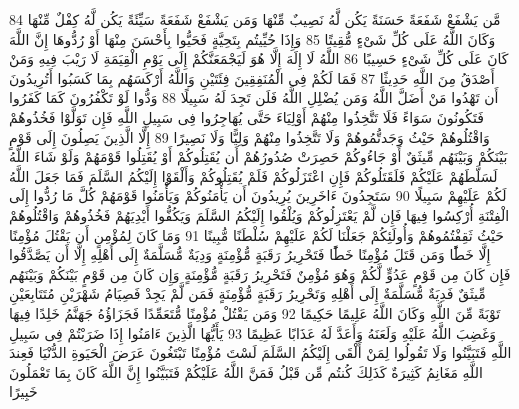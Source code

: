 {\tiny\colorbox{cl_aya}{84}} مَّن يَشْفَعْ شَفَعَةً حَسَنَةً يَكُن لَّهُ نَصِيبٌ مِّنْهَا وَمَن يَشْفَعْ شَفَعَةً سَيِّئَةً يَكُن لَّهُ كِفْلٌ مِّنْهَا وَكَانَ اللَّهُ عَلَى كُلِّ شَىْءٍ مُّقِيتًا
{\tiny\colorbox{cl_aya}{85}} وَإِذَا حُيِّيتُم بِتَحِيَّةٍ فَحَيُّوا بِأَحْسَنَ مِنْهَا أَوْ رُدُّوهَا إِنَّ اللَّهَ كَانَ عَلَى كُلِّ شَىْءٍ حَسِيبًا
{\tiny\colorbox{cl_aya}{86}} اللَّهُ لَا إِلَهَ إِلَّا هُوَ لَيَجْمَعَنَّكُمْ إِلَى يَوْمِ الْقِيَمَةِ لَا رَيْبَ فِيهِ وَمَنْ أَصْدَقُ مِنَ اللَّهِ حَدِيثًا
{\tiny\colorbox{cl_aya}{87}} فَمَا لَكُمْ فِى الْمُنَفِقِينَ فِئَتَيْنِ وَاللَّهُ أَرْكَسَهُم بِمَا كَسَبُوا أَتُرِيدُونَ أَن تَهْدُوا مَنْ أَضَلَّ اللَّهُ وَمَن يُضْلِلِ اللَّهُ فَلَن تَجِدَ لَهُ سَبِيلًا
{\tiny\colorbox{cl_aya}{88}} وَدُّوا لَوْ تَكْفُرُونَ كَمَا كَفَرُوا فَتَكُونُونَ سَوَاءً فَلَا تَتَّخِذُوا مِنْهُمْ أَوْلِيَاءَ حَتَّى يُهَاجِرُوا فِى سَبِيلِ اللَّهِ فَإِن تَوَلَّوْا فَخُذُوهُمْ وَاقْتُلُوهُمْ حَيْثُ وَجَدتُّمُوهُمْ وَلَا تَتَّخِذُوا مِنْهُمْ وَلِيًّا وَلَا نَصِيرًا
{\tiny\colorbox{cl_aya}{89}} إِلَّا الَّذِينَ يَصِلُونَ إِلَى قَوْمٍ بَيْنَكُمْ وَبَيْنَهُم مِّيثَقٌ أَوْ جَاءُوكُمْ حَصِرَتْ صُدُورُهُمْ أَن يُقَتِلُوكُمْ أَوْ يُقَتِلُوا قَوْمَهُمْ وَلَوْ شَاءَ اللَّهُ لَسَلَّطَهُمْ عَلَيْكُمْ فَلَقَتَلُوكُمْ فَإِنِ اعْتَزَلُوكُمْ فَلَمْ يُقَتِلُوكُمْ وَأَلْقَوْا إِلَيْكُمُ السَّلَمَ فَمَا جَعَلَ اللَّهُ لَكُمْ عَلَيْهِمْ سَبِيلًا
{\tiny\colorbox{cl_aya}{90}} سَتَجِدُونَ ءَاخَرِينَ يُرِيدُونَ أَن يَأْمَنُوكُمْ وَيَأْمَنُوا قَوْمَهُمْ كُلَّ مَا رُدُّوا إِلَى الْفِتْنَةِ أُرْكِسُوا فِيهَا فَإِن لَّمْ يَعْتَزِلُوكُمْ وَيُلْقُوا إِلَيْكُمُ السَّلَمَ وَيَكُفُّوا أَيْدِيَهُمْ فَخُذُوهُمْ وَاقْتُلُوهُمْ حَيْثُ ثَقِفْتُمُوهُمْ وَأُولَئِكُمْ جَعَلْنَا لَكُمْ عَلَيْهِمْ سُلْطَنًا مُّبِينًا
{\tiny\colorbox{cl_aya}{91}} وَمَا كَانَ لِمُؤْمِنٍ أَن يَقْتُلَ مُؤْمِنًا إِلَّا خَطًَٔا وَمَن قَتَلَ مُؤْمِنًا خَطًَٔا فَتَحْرِيرُ رَقَبَةٍ مُّؤْمِنَةٍ وَدِيَةٌ مُّسَلَّمَةٌ إِلَى أَهْلِهِ إِلَّا أَن يَصَّدَّقُوا فَإِن كَانَ مِن قَوْمٍ عَدُوٍّ لَّكُمْ وَهُوَ مُؤْمِنٌ فَتَحْرِيرُ رَقَبَةٍ مُّؤْمِنَةٍ وَإِن كَانَ مِن قَوْمٍ بَيْنَكُمْ وَبَيْنَهُم مِّيثَقٌ فَدِيَةٌ مُّسَلَّمَةٌ إِلَى أَهْلِهِ وَتَحْرِيرُ رَقَبَةٍ مُّؤْمِنَةٍ فَمَن لَّمْ يَجِدْ فَصِيَامُ شَهْرَيْنِ مُتَتَابِعَيْنِ تَوْبَةً مِّنَ اللَّهِ وَكَانَ اللَّهُ عَلِيمًا حَكِيمًا
{\tiny\colorbox{cl_aya}{92}} وَمَن يَقْتُلْ مُؤْمِنًا مُّتَعَمِّدًا فَجَزَاؤُهُ جَهَنَّمُ خَلِدًا فِيهَا وَغَضِبَ اللَّهُ عَلَيْهِ وَلَعَنَهُ وَأَعَدَّ لَهُ عَذَابًا عَظِيمًا
{\tiny\colorbox{cl_aya}{93}} يَأَيُّهَا الَّذِينَ ءَامَنُوا إِذَا ضَرَبْتُمْ فِى سَبِيلِ اللَّهِ فَتَبَيَّنُوا وَلَا تَقُولُوا لِمَنْ أَلْقَى إِلَيْكُمُ السَّلَمَ لَسْتَ مُؤْمِنًا تَبْتَغُونَ عَرَضَ الْحَيَوةِ الدُّنْيَا فَعِندَ اللَّهِ مَغَانِمُ كَثِيرَةٌ كَذَلِكَ كُنتُم مِّن قَبْلُ فَمَنَّ اللَّهُ عَلَيْكُمْ فَتَبَيَّنُوا إِنَّ اللَّهَ كَانَ بِمَا تَعْمَلُونَ خَبِيرًا

